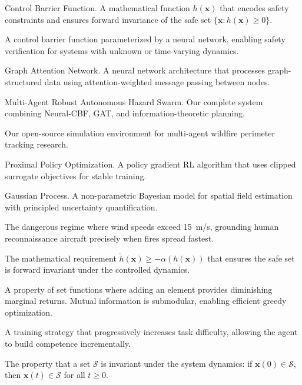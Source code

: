 \documentclass[12pt,a4paper]{article}
\DeclareRobustCommand{\cS}{\mathcal{S}}
\DeclareRobustCommand{\vect}[1]{\bm{#1}}
\begin{document}
\begin{description}[leftmargin=!, labelwidth=3cm]
    \item[CBF] Control Barrier Function. A mathematical function $h(\vect{x})$ that encodes safety constraints and ensures forward invariance of the safe set $\{\vect{x} : h(\vect{x}) \geq 0\}$.
    
    \item[Neural-CBF] A control barrier function parameterized by a neural network, enabling safety verification for systems with unknown or time-varying dynamics.
    
    \item[GAT] Graph Attention Network. A neural network architecture that processes graph-structured data using attention-weighted message passing between nodes.
    
    \item[MARAHS] Multi-Agent Robust Autonomous Hazard Swarm. Our complete system combining Neural-CBF, GAT, and information-theoretic planning.
    
    \item[PlumeGym-MARL] Our open-source simulation environment for multi-agent wildfire perimeter tracking research.
    
    \item[PPO] Proximal Policy Optimization. A policy gradient RL algorithm that uses clipped surrogate objectives for stable training.
    
    \item[GP] Gaussian Process. A non-parametric Bayesian model for spatial field estimation with principled uncertainty quantification.
    
    \item[Wind Grounding Gap] The dangerous regime where wind speeds exceed 15~m/s, grounding human reconnaissance aircraft precisely when fires spread fastest.
    
    \item[CBF condition] The mathematical requirement $\dot{h}(\vect{x}) \geq -\alpha(h(\vect{x}))$ that ensures the safe set is forward invariant under the controlled dynamics.
    
    \item[Submodularity] A property of set functions where adding an element provides diminishing marginal returns. Mutual information is submodular, enabling efficient greedy optimization.
    
    \item[Curriculum learning] A training strategy that progressively increases task difficulty, allowing the agent to build competence incrementally.
    
    \item[Forward invariance] The property that a set $\cS$ is invariant under the system dynamics: if $\vect{x}(0) \in \cS$, then $\vect{x}(t) \in \cS$ for all $t \geq 0$.
\end{description}
\end{document}
